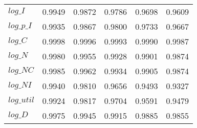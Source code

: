 \begin{center}
\begin{longtable}{lccccc}
$log\_I     $	 & 	    0.9949	 & 	    0.9872	 & 	    0.9786	 & 	    0.9698	 & 	    0.9609 \\ 
$log\_p\_I  $	 & 	    0.9935	 & 	    0.9867	 & 	    0.9800	 & 	    0.9733	 & 	    0.9667 \\ 
$log\_C     $	 & 	    0.9998	 & 	    0.9996	 & 	    0.9993	 & 	    0.9990	 & 	    0.9987 \\ 
$log\_N     $	 & 	    0.9980	 & 	    0.9955	 & 	    0.9928	 & 	    0.9901	 & 	    0.9874 \\ 
$log\_NC    $	 & 	    0.9985	 & 	    0.9962	 & 	    0.9934	 & 	    0.9905	 & 	    0.9874 \\ 
$log\_NI    $	 & 	    0.9940	 & 	    0.9810	 & 	    0.9656	 & 	    0.9493	 & 	    0.9327 \\ 
$log\_util  $	 & 	    0.9924	 & 	    0.9817	 & 	    0.9704	 & 	    0.9591	 & 	    0.9479 \\ 
$log\_D     $	 & 	    0.9975	 & 	    0.9945	 & 	    0.9915	 & 	    0.9885	 & 	    0.9855 \\ 
\end{longtable}
 \end{center}
